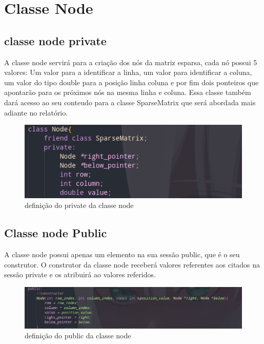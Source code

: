 \documentclass[a4paper,12pt]{article}
\begin{document}
\section{Classe Node}
\subsection{classe node private}
    
A classe node servirá para a criação dos nós da matriz esparsa, cada nó possui 5 valores:
Um valor para a identificar a linha, um valor para identificar a coluna, um valor do tipo double para a posição linha coluna e por fim dois ponteiros que apontarão para os próximos nós na mesma linha e coluna.
Essa classe também dará acesso ao seu conteudo para a classe SparseMatrix que será abordada mais adiante no relatório.

\begin{figure}[h]
\centering
\includegraphics[width=1\textwidth]{Imagens/node/class-node-private.png}
\caption{\label{fig:nodeprivate} definição do private da classe node}
\end{figure}

\subsection{Classe node Public}
A classe node possui apenas um elemento na sua sessão public, que é o seu construtor. 
O construtor da classe node receberá valores referentes aos citados na sessão private e os atribuirá ao valores referidos.

\begin{figure}[h]
\centering
\includegraphics[width=1\textwidth]{Imagens/node/class-node-public.png}
\caption{\label{fig:nodepublic} definição do public da classe node}
\end{figure}
\end{document}
